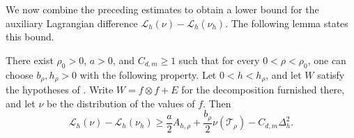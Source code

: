 We now combine the preceding estimates to obtain a lower bound for the
auxiliary Lagrangian difference $\mathcal L_h(\nu)-\mathcal L_h(\nu_h)$.
The following lemma states this bound.

\begin{lemma}
\label{lem:auxiliary-lagrangian-bound}
There exist $\rho_0>0$, $a>0$, and $C_{d,m}\ge1$ such that
for every $0<\rho<\rho_0$, one can choose $b_\rho,h_\rho>0$ with the following property.
Let $0<h<h_\rho$, and let $W$ satisfy the hypotheses of
.  Write $W=f\otimes f+E$ for the
decomposition furnished there, and let $\nu$ be the distribution of the
values of $f$.  Then
\begin{equation}\label{eq:auxiliary-lagrangian-bound}
  \mathcal L_h(\nu)-\mathcal L_h(\nu_h)
  \ge \frac{a}{2} A_{h,\rho}
    +\frac{b_\rho}{2} \nu(\mathcal T_\rho)
    -C_{d,m}\Delta_h^2.
\end{equation}
\end{lemma}

